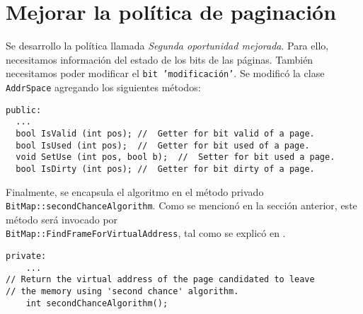 \section{Mejorar la política de paginación}
Se desarrollo la política llamada \textit{Segunda oportunidad mejorada}. Para ello, necesitamos información del estado de los bits de las páginas. También necesitamos poder modificar el \texttt{bit 'modificación'}. Se modificó la clase \texttt{AddrSpace} agregando los siguientes métodos:
\begin{lstlisting}[style=C]
public:
  ...
  bool IsValid (int pos); //  Getter for bit valid of a page.
  bool IsUsed (int pos);  //  Getter for bit used of a page.
  void SetUse (int pos, bool b);  //  Setter for bit used a page.
  bool IsDirty (int pos); //  Getter for bit dirty of a page.  
\end{lstlisting}
Finalmente, se encapsula el algoritmo en el método privado \texttt{BitMap::secondChanceAlgorithm}. Como se mencionó en la sección anterior, este método será invocado por\\ \texttt{BitMap::FindFrameForVirtualAddress}, tal como se explicó en .
\begin{lstlisting}[style=C]
  private:
    ...
// Return the virtual address of the page candidated to leave
// the memory using 'second chance' algorithm.
    int secondChanceAlgorithm();
\end{lstlisting}    